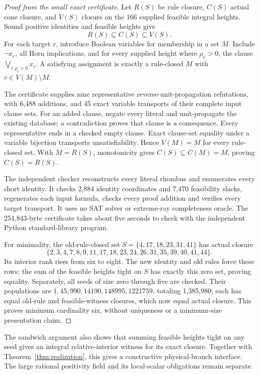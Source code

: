\begin{proof}[Proof from the small exact certificate]
Let \(R(S)\) be rule closure, \(C(S)\) actual cone closure, and \(V(S)\)
closure on the 166 supplied feasible integral heights. Sound positive
identities and feasible heights give
\[
R(S)\subseteq C(S)\subseteq V(S).
\]
For each target \(r\), introduce Boolean variables for membership in a set
\(M\). Include \(\neg x_r\), all Horn implications, and for every supplied
height where \(\rho_r>0\), the clause
\(\bigvee_{i:\rho_i>0}x_i\). A satisfying assignment is exactly a
rule-closed \(M\) with \(r\in V(M)\setminus M\).

The certificate supplies nine representative reverse-unit-propagation
refutations, with 6,488 additions, and 45 exact variable transports of their
complete input clause sets. For an added clause, negate every literal and
unit-propagate the existing database; a contradiction proves that clause
is a consequence. Every representative ends in a checked empty clause.
Exact clause-set equality under a variable bijection transports
unsatisfiability. Hence \(V(M)=M\) for every rule-closed set. With
\(M=R(S)\), monotonicity gives \(C(S)\subseteq C(M)=M\), proving
\(C(S)=R(S)\).

The independent checker reconstructs every literal rhombus and enumerates
every short identity. It checks 2,884 identity coordinates and
7,470 feasibility slacks, regenerates each input formula, checks every proof
addition and verifies every target transport. It uses no SAT solver or
extreme-ray completeness oracle. The 254,843-byte certificate takes about
five seconds to check with the independent Python standard-library program.

For minimality, the old-rule-closed set
\(S=\{4,17,18,23,31,41\}\) has actual closure
\[
\{2,3,4,7,8,9,11,17,18,23,24,26,31,35,39,40,41,44\}.
\]
Its interior rank rises from six to eight. The new identity and old rules
force these rows; the sum of the feasible heights tight on \(S\) has exactly
this zero set, proving equality. Separately, all seeds of size zero through
five are checked. Their populations are
\(1,45,990,14190,148995,1221759\), totaling 1,385,980; each has equal
old-rule and feasible-witness closures, which now equal actual closure.
This proves minimum cardinality six, without uniqueness or a minimum-size
presentation claim.
\end{proof}

The sandwich argument also shows that summing feasible heights tight on
any seed gives an integral relative-interior witness for its exact closure.
Together with Theorem~\ref{thm:realization}, this gives a constructive
physical-branch interface. The large rational positivity field and its
local-scalar obligations remain separate.
